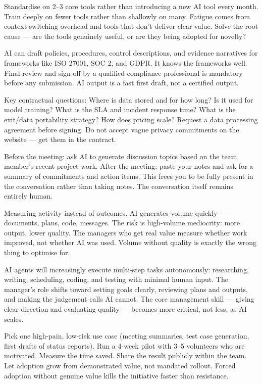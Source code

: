 {Standardise on 2--3 core tools rather than introducing a new AI tool every month.
Train deeply on fewer tools rather than shallowly on many.
Fatigue comes from context-switching overhead and tools that don't deliver clear value.
Solve the root cause --- are the tools genuinely useful, or are they being adopted for
novelty?}

{AI can draft policies, procedures, control descriptions, and evidence narratives for
frameworks like ISO 27001, SOC 2, and GDPR.
It knows the frameworks well.
Final review and sign-off by a qualified compliance professional is mandatory before
any submission.
AI output is a fast first draft, not a certified output.}

{Key contractual questions: Where is data stored and for how long? Is it used for
model training? What is the SLA and incident response time? What is the exit/data
portability strategy? How does pricing scale?
Request a data processing agreement before signing.
Do not accept vague privacy commitments on the website --- get them in the contract.}

{Before the meeting: ask AI to generate discussion topics based on the team member's
recent project work.
After the meeting: paste your notes and ask for a summary of commitments and
action items.
This frees you to be fully present in the conversation rather than taking notes.
The conversation itself remains entirely human.}

{Measuring activity instead of outcomes.
AI generates volume quickly --- documents, plans, code, messages.
The risk is high-volume mediocrity: more output, lower quality.
The managers who get real value measure whether work improved, not whether AI was used.
Volume without quality is exactly the wrong thing to optimise for.}

{AI agents will increasingly execute multi-step tasks autonomously: researching,
writing, scheduling, coding, and testing with minimal human input.
The manager's role shifts toward setting goals clearly, reviewing plans and outputs,
and making the judgement calls AI cannot.
The core management skill --- giving clear direction and evaluating quality --- becomes
more critical, not less, as AI scales.}

{Pick one high-pain, low-risk use case (meeting summaries, test case generation, first
drafts of status reports).
Run a 4-week pilot with 3--5 volunteers who are motivated.
Measure the time saved.
Share the result publicly within the team.
Let adoption grow from demonstrated value, not mandated rollout.
Forced adoption without genuine value kills the initiative faster than resistance.}
